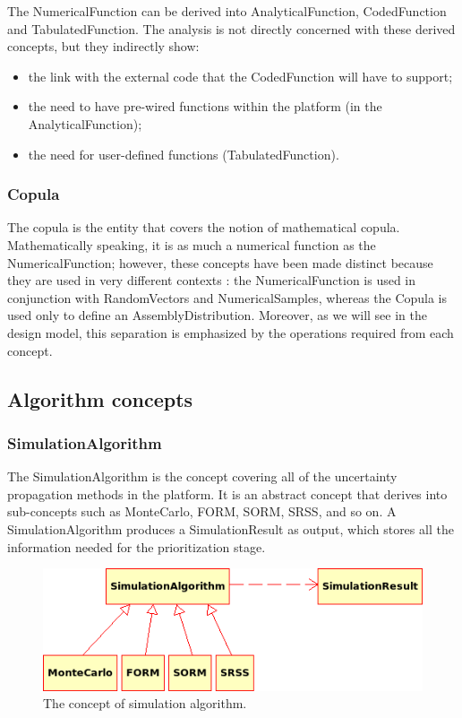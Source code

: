 The NumericalFunction can be derived into AnalyticalFunction, CodedFunction and TabulatedFunction. The analysis is not directly concerned with these derived concepts, but they indirectly show:
\begin{itemize}
\item the link with the external code that the CodedFunction will have to support;
\item the need to have pre-wired functions within the platform (in the AnalyticalFunction);
\item the need for user-defined functions (TabulatedFunction).
\end{itemize}

\subsubsection{Copula}

The copula is the entity that covers the notion of mathematical copula. Mathematically speaking, it is as much a numerical function as the NumericalFunction; however, these concepts have been made distinct because they are used in very different contexts : the NumericalFunction is used in conjunction with RandomVectors and NumericalSamples, whereas the Copula is used only to define an AssemblyDistribution. Moreover, as we will see in the design model, this separation is emphasized by the operations required from each concept.

\subsection{Algorithm concepts}

\subsubsection{SimulationAlgorithm}

The SimulationAlgorithm is the concept covering all of the uncertainty propagation methods in the platform. It is an abstract concept that derives into sub-concepts such as MonteCarlo, FORM, SORM, SRSS, and so on. A SimulationAlgorithm produces a SimulationResult as output, which stores all the information needed for the prioritization stage.

\begin{figure}[htb]
  \begin{center}
    \includegraphics[scale=0.8]{Figures/analysis/simulation_algo.png}
    \caption{The concept of simulation algorithm.}\label{fig:simulation_algo}
  \end{center}
\end{figure}

